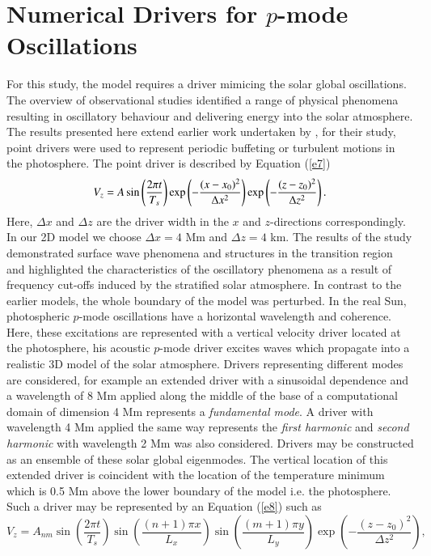 \documentclass[preprint,authoryear,12pt]{elsarticle}
\begin{document}
\section{Numerical Drivers for $p$-mode Oscillations}
For this study, the model requires a driver mimicing the solar global oscillations.  The overview of observational studies identified a range of physical phenomena resulting in oscillatory behaviour and delivering energy into the solar atmosphere.  The results presented here extend earlier work undertaken by  \citet{Malins2007A}, for their study, point drivers were used to represent periodic buffeting or turbulent motions in the photosphere. The point driver is described by Equation (\ref{e7}) 
\begin{equation}
V_{z}=A \sin\left({2\pi t}\over{T_s} \right)  \exp\left( -\frac{(x-x_0)^{2}}{\Delta x^2} \right)
\exp\left( -\frac{(z-z_0)^{2}}{\Delta z^{2}}\right).
\label{e7}
\end{equation}
Here, $\Delta x$ and $\Delta z$ are the driver width in the $x$ and $z$-directions correspondingly. In our 2D model 
we choose $\Delta x= 4$ Mm and $\Delta z=4$ km. The results of the study demonstrated surface wave 
phenomena and structures in the transition region and highlighted the characteristics of the oscillatory 
phenomena as a result of frequency cut-offs induced by the stratified solar atmosphere. In contrast to the 
earlier models, the whole boundary of the model was perturbed.  In the real Sun, photospheric $p$-mode 
oscillations have a horizontal wavelength and coherence. Here, these excitations are represented with a 
vertical velocity driver located at the photosphere, his acoustic $p$-mode driver excites waves which propagate 
into a realistic 3D model of the solar atmosphere. Drivers representing different modes are considered, for 
example  an extended driver with a sinusoidal dependence and a wavelength of 8 Mm applied along the 
middle of the base of a computational domain of dimension 4 Mm represents  a {\it fundamental mode}. 
A driver with wavelength 4 Mm applied the same way represents the {\it first harmonic} and {\it second harmonic} 
with wavelength 2 Mm was also considered. Drivers may be constructed as an ensemble of these solar 
global eigenmodes.  The vertical location of this extended driver is coincident with the location of the temperature minimum which is 
0.5 Mm above the lower boundary of the model i.e. the photosphere. Such a driver may be represented 
by an Equation (\ref{e8}) such as  
\begin{equation}
V_{z}=A_{nm} \sin\left(\frac{2\pi t}{T_s} \right)\sin\left(  \frac{(n+1)\pi x}{L_x} \right)  \sin\left(\frac{(m+1)\pi y}{L_y} \right)
\exp\left( -\frac{(z-z_0)^2}{\Delta z^2} \right),
\label{e8}
\end{equation}
\end{document}
